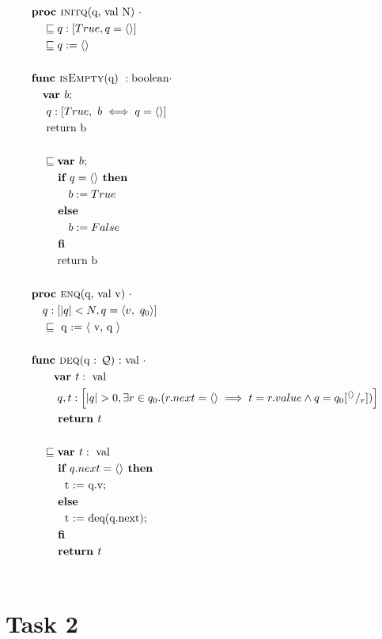 \documentclass[a4paper]{scrartcl}
\newcommand{\refinedby}{\sqsubseteq} %
\begin{document}
\begin{align*}
& \textbf{proc }\text{\textsc{initq}(q, val N) } \cdot \\ 
    &\quad \refinedby  q : [True, q = \langle \rangle ] \\
    & \quad \refinedby q := \langle \rangle \\\\
& \textbf{func }\text{\textsc{isEmpty}(q) } : \text{boolean} \cdot  \\ 
	& \quad \textbf{var } b; \\
	& \quad ~ q : [True,~b \iff q = \langle \rangle  ] \\
	& \quad \text{ return b} \\\\
	& \quad \refinedby \textbf{var } b; \\
	& \quad \quad \textbf{ if } q = \langle \rangle \textbf{ then} \\
	& \quad \quad \quad ~ b := True \\
	& \quad \quad \textbf{ else} \\
	& \quad \quad \quad  ~ b := False \\
	& \quad \quad\textbf{ fi} \\
	& \quad \quad\text{ return b} \\\\
& \textbf{proc }\text{\textsc{enq}(q, val v) } \cdot\\
	& \quad q : \left[|q| < N, q = \langle v,~q_0 \rangle \right] \\
    & \quad \refinedby \text{ q := $\langle$ v, q $\rangle$}\\\\
& \textbf{func }\text{\textsc{deq}(q : $\mathcal{Q}$) :} \text{ val } \cdot \\
    & \quad \quad \textbf{var }t : \text{ val} \\
	& \quad \quad ~q, t : \left[ |q| > 0, \exists r \in q_0.( r.next = \langle \rangle \implies t = r.value \land q = q_0[^{\langle \rangle}/_r]) \right] \\
    & \quad \quad \textbf{ return } t \\\\
    & \quad \refinedby \textbf{var }t : \text{ val} \\
    & \quad \quad \textbf{ if } q.next = \langle \rangle \textbf{ then} \\
	& \quad \quad \quad \text{t := q.v;} \\
    & \quad \quad \textbf{ else} \\
	& \quad \quad \quad \text{t := deq(q.next);} \\
    & \quad \quad \textbf{ fi} \\
    & \quad \quad \textbf{ return } t \\\\
\end{align*}

\section*{Task 2}
\end{document}
